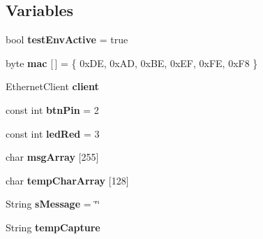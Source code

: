 \subsection*{Variables}
\begin{DoxyCompactItemize}
\item 
\mbox{\label{_arduino_morse_client_8ino_aa3b0f3cd09cf5f54f379b6cdd2d45cb2}} 
bool {\bfseries test\+Env\+Active} = true
\item 
\mbox{\label{_arduino_morse_client_8ino_aea3f7775fecafb66a619eb2dcb0357bd}} 
byte {\bfseries mac} \mbox{[}$\,$\mbox{]} = \{ 0x\+D\+E, 0x\+A\+D, 0x\+B\+E, 0x\+E\+F, 0x\+F\+E, 0x\+F8 \}
\item 
\mbox{\label{_arduino_morse_client_8ino_a058da3453d064890d1eb0a5e2f730807}} 
Ethernet\+Client {\bfseries client}
\item 
\mbox{\label{_arduino_morse_client_8ino_a67fc04bcef82c18a95567e37e5695fc3}} 
const int {\bfseries btn\+Pin} = 2
\item 
\mbox{\label{_arduino_morse_client_8ino_abdaa7e302e35cf528bfcf79a08bf44bf}} 
const int {\bfseries led\+Red} = 3
\item 
\mbox{\label{_arduino_morse_client_8ino_afe180e4d895b454d4e4e405a6aa2fc8a}} 
char {\bfseries msg\+Array} \mbox{[}255\mbox{]}
\item 
\mbox{\label{_arduino_morse_client_8ino_a4ee8b00e42eef40449cac5cb3d4f50d4}} 
char {\bfseries temp\+Char\+Array} \mbox{[}128\mbox{]}
\item 
\mbox{\label{_arduino_morse_client_8ino_a5549cda51b5cdfaa580b2afff4aa9614}} 
String {\bfseries s\+Message} = \char`\"{}\char`\"{}
\item 
\mbox{\label{_arduino_morse_client_8ino_a6ca5036f31eb60b8260d078976e59149}} 
String {\bfseries temp\+Capture}
\item 
\mbox{\label{_arduino_morse_client_8ino_afeccd31cd54fd45f667e50c6152910e1}} 

\end{DoxyCompactItemize}
